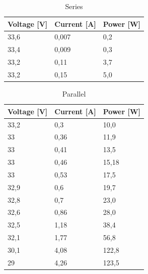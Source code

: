 \documentclass[12pt]{article}
\begin{document}
\begin{table}[h]
	\centering
	\begin{tabular}{|p{2cm}|p{2cm}|p{2cm}|}
		\hline
		\rowcolor{Green!80} Voltage [V] & Current [A] & Power [W] \\
		\hline
		\rowcolor{LimeGreen!70} 33,6    & 0,007       & 0,2       \\
		\hline
		\rowcolor{YellowGreen!70} 33,4  & 0,009       & 0,3       \\
		\hline
		\rowcolor{LimeGreen!70} 33,2    & 0,11        & 3,7       \\
		\hline
		\rowcolor{YellowGreen!70} 33,2  & 0,15        & 5,0       \\
		\hline
	\end{tabular}
	\caption{Series}
	\label{tab:my_label}
\end{table}

\begin{table}[h]
	\centering
	\begin{tabular}{|p{2cm}|p{2cm}|p{2cm}|}
		\hline
		\rowcolor{RedOrange!80} Voltage [V] & Current [A] & Power [W] \\
		\hline
		\rowcolor{Peach!70} 33,2            & 0,3         & 10,0      \\
		\hline
		\rowcolor{Melon!70} 33              & 0,36        & 11,9      \\
		\hline
		\rowcolor{Peach!70} 33              & 0,41        & 13,5      \\
		\hline
		\rowcolor{Melon!70} 33              & 0,46        & 15,18     \\
		\hline
		\rowcolor{Peach!70} 33              & 0,53        & 17,5      \\
		\hline
		\rowcolor{Melon!70} 32,9            & 0,6         & 19,7      \\
		\hline
		\rowcolor{Peach!70} 32,8            & 0,7         & 23,0      \\
		\hline
		\rowcolor{Melon!70} 32,6            & 0,86        & 28,0      \\
		\hline
		\rowcolor{Peach!70} 32,5            & 1,18        & 38,4      \\
		\hline
		\rowcolor{Melon!70} 32,1            & 1,77        & 56,8      \\
		\hline
		\rowcolor{Peach!70} 30,1            & 4,08        & 122,8     \\
		\hline
		\rowcolor{Melon!70} 29              & 4,26        & 123,5     \\
		\hline
	\end{tabular}
	\caption{Parallel}
	\label{tab:my_label}
\end{table}
\end{document}
